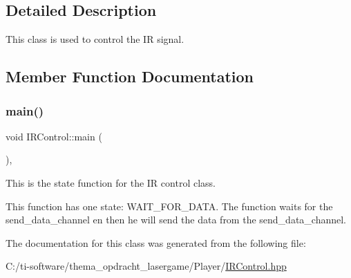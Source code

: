 \subsection{Detailed Description}
This class is used to control the IR signal. 

\subsection{Member Function Documentation}
\mbox{\label{class_i_r_control_a015c547c9a8a37bc99fc3f98190b6787}} 
\subsubsection{\texorpdfstring{main()}{main()}}
{\footnotesize\ttfamily void I\+R\+Control\+::main (\begin{DoxyParamCaption}{ }\end{DoxyParamCaption})\hspace{0.3cm}{\ttfamily [inline]}, {\ttfamily [override]}}



This is the state function for the IR control class. 

This function has one state\+: W\+A\+I\+T\+\_\+\+F\+O\+R\+\_\+\+D\+A\+TA. The function waits for the send\+\_\+data\+\_\+channel en then he will send the data from the send\+\_\+data\+\_\+channel. 

The documentation for this class was generated from the following file\+:\begin{DoxyCompactItemize}
\item 
C\+:/ti-\/software/thema\+\_\+opdracht\+\_\+lasergame/\+Player/\mbox{\hyperlink{_i_r_control_8hpp}{I\+R\+Control.\+hpp}}\end{DoxyCompactItemize}
